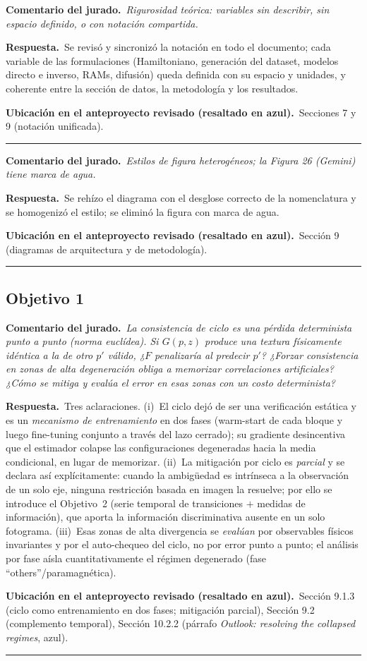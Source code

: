 \documentclass[11pt]{article}
\newcommand{\comentario}[1]{\par\smallskip\noindent\textbf{\color{jgris}Comentario del jurado.}\ \textit{#1}\par}
\newcommand{\respuesta}[1]{\par\smallskip\noindent\textbf{\color{jverde}Respuesta.}\ #1\par}
\newcommand{\ubic}[1]{\par\smallskip\noindent\textbf{\color{jazul}Ubicación en el anteproyecto revisado (resaltado en azul).}\ #1\par\medskip\hrule\medskip}
\begin{document}
\comentario{Rigurosidad teórica: variables sin describir, sin espacio definido, o con notación compartida.}
\respuesta{Se revisó y sincronizó la notación en todo el documento; cada variable de las formulaciones (Hamiltoniano, generación del dataset, modelos directo e inverso, RAMs, difusión) queda definida con su espacio y unidades, y coherente entre la sección de datos, la metodología y los resultados.}
\ubic{Secciones 7 y 9 (notación unificada).}

\comentario{Estilos de figura heterogéneos; la Figura 26 (Gemini) tiene marca de agua.}
\respuesta{Se rehízo el diagrama con el desglose correcto de la nomenclatura y se homogenizó el estilo; se eliminó la figura con marca de agua.}
\ubic{Sección 9 (diagramas de arquitectura y de metodología).}

\subsection{Objetivo 1}

\comentario{La consistencia de ciclo es una pérdida determinista punto a punto (norma euclídea). Si $G(p,z)$ produce una textura físicamente idéntica a la de otro $p'$ válido, ¿$F$ penalizaría al predecir $p'$? ¿Forzar consistencia en zonas de alta degeneración obliga a memorizar correlaciones artificiales? ¿Cómo se mitiga y evalúa el error en esas zonas con un costo determinista?}
\respuesta{Tres aclaraciones. (i)~El ciclo dejó de ser una verificación estática y es un \emph{mecanismo de entrenamiento} en dos fases (warm-start de cada bloque y luego fine-tuning conjunto a través del lazo cerrado); su gradiente desincentiva que el estimador colapse las configuraciones degeneradas hacia la media condicional, en lugar de memorizar. (ii)~La mitigación por ciclo es \emph{parcial} y se declara así explícitamente: cuando la ambigüedad es intrínseca a la observación de un solo eje, ninguna restricción basada en imagen la resuelve; por ello se introduce el Objetivo~2 (serie temporal de transiciones $+$ medidas de información), que aporta la información discriminativa ausente en un solo fotograma. (iii)~Esas zonas de alta divergencia se \emph{evalúan} por observables físicos invariantes y por el auto-chequeo del ciclo, no por error punto a punto; el análisis por fase aísla cuantitativamente el régimen degenerado (fase ``others''/paramagnética).}
\ubic{Sección 9.1.3 (ciclo como entrenamiento en dos fases; mitigación parcial), Sección 9.2 (complemento temporal), Sección 10.2.2 (párrafo \emph{Outlook: resolving the collapsed regimes}, azul).}
\end{document}
